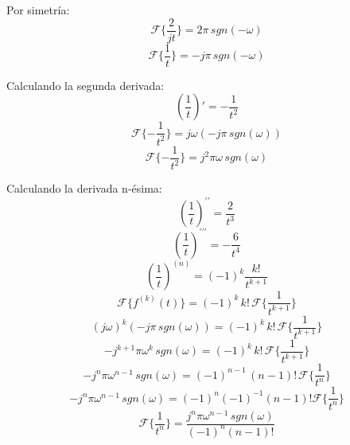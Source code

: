 Por simetría:
\begin{equation*}
    \mathcal{F}\{\frac{2}{jt}\}=2\pi\,sgn(-\omega)
\end{equation*}
\begin{equation}
    \mathcal{F}\{\frac{1}{t}\}=-j\pi\,sgn(-\omega)
\end{equation}

Calculando la segunda derivada:
\begin{equation*}
    \left(\frac{1}{t}\right)'=-\frac{1}{t^2}
\end{equation*}
\begin{equation*}
    \mathcal{F}\{-\frac{1}{t^2}\}=j\omega(-j\pi\,sgn(\omega))
\end{equation*}
\begin{equation*}
    \mathcal{F}\{-\frac{1}{t^2}\}=j^2\pi\omega\,sgn(\omega)
\end{equation*}

Calculando la derivada n-ésima:
\begin{equation*}
    {\left(\frac{1}{t}\right)}^{\prime\prime}=\frac{2}{t^3}
\end{equation*}
\begin{equation*}
    {\left(\frac{1}{t}\right)}^{\prime\prime\prime}=-\frac{6}{t^4}
\end{equation*}
\begin{equation*}
    {\left(\frac{1}{t}\right)}^{(n)}={(-1)}^k \frac{k!}{t^{k+1}}
\end{equation*}
\begin{equation*}
    \mathcal{F}\{f^{(k)}(t)\}={(-1)}^k\,k!\,\mathcal{F}\{\frac{1}{t^{k+1}}\}
\end{equation*}
\begin{equation*}
    {(j\omega)}^k(-j\pi\,sgn(\omega))={(-1)}^k\,k!\,\mathcal{F}\{\frac{1}{t^{k+1}}\}
\end{equation*}
\begin{equation*}
    -j^{k+1}\pi\omega^k\,sgn(\omega)={(-1)}^k\,k!\,\mathcal{F}\{\frac{1}{t^{k+1}}\}
\end{equation*}
\begin{equation*}
    -j^n\pi\omega^{n-1}\,sgn(\omega)={(-1)}^{n-1}\,(n-1)!\,\mathcal{F}\{\frac{1}{t^n}\}
\end{equation*}
\begin{equation*}
    -j^n\pi\omega^{n-1}\,sgn(\omega)={(-1)}^n{(-1)}^{-1}(n-1)!\mathcal{F}\{\frac{1}{t^n}\}
\end{equation*}
\begin{equation}
    \mathcal{F}\{\frac{1}{t^n}\}=\frac{j^n\pi{\omega}^{n-1}\,sgn(\omega)}{{(-1)}^n(n-1)!}
\end{equation}

